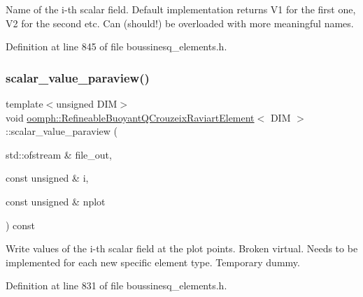 Name of the i-\/th scalar field. Default implementation returns V1 for the first one, V2 for the second etc. Can (should!) be overloaded with more meaningful names. 



Definition at line 845 of file boussinesq\+\_\+elements.\+h.

\mbox{\label{classoomph_1_1RefineableBuoyantQCrouzeixRaviartElement_a9a8ee12b27daa327e97fbacc89c341c6}} 
\subsubsection{\texorpdfstring{scalar\+\_\+value\+\_\+paraview()}{scalar\_value\_paraview()}}
{\footnotesize\ttfamily template$<$unsigned D\+IM$>$ \\
void \hyperlink{classoomph_1_1RefineableBuoyantQCrouzeixRaviartElement}{oomph\+::\+Refineable\+Buoyant\+Q\+Crouzeix\+Raviart\+Element}$<$ D\+IM $>$\+::scalar\+\_\+value\+\_\+paraview (\begin{DoxyParamCaption}\item[{std\+::ofstream \&}]{file\+\_\+out,  }\item[{const unsigned \&}]{i,  }\item[{const unsigned \&}]{nplot }\end{DoxyParamCaption}) const\hspace{0.3cm}{\ttfamily [inline]}}



Write values of the i-\/th scalar field at the plot points. Broken virtual. Needs to be implemented for each new specific element type. Temporary dummy. 



Definition at line 831 of file boussinesq\+\_\+elements.\+h.

\mbox{\label{classoomph_1_1RefineableBuoyantQCrouzeixRaviartElement_ac6a973ee5e4d7425db2e7f9a259bab46}} 
